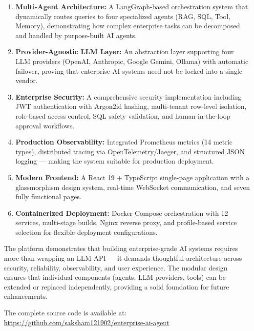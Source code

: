\documentclass[12pt, a4paper]{report}
\begin{document}
\begin{enumerate}
    \item \textbf{Multi-Agent Architecture:} A LangGraph-based orchestration system that dynamically routes queries to four specialized agents (RAG, SQL, Tool, Memory), demonstrating how complex enterprise tasks can be decomposed and handled by purpose-built AI agents.

    \item \textbf{Provider-Agnostic LLM Layer:} An abstraction layer supporting four LLM providers (OpenAI, Anthropic, Google Gemini, Ollama) with automatic failover, proving that enterprise AI systems need not be locked into a single vendor.

    \item \textbf{Enterprise Security:} A comprehensive security implementation including JWT authentication with Argon2id hashing, multi-tenant row-level isolation, role-based access control, SQL safety validation, and human-in-the-loop approval workflows.

    \item \textbf{Production Observability:} Integrated Prometheus metrics (14 metric types), distributed tracing via OpenTelemetry/Jaeger, and structured JSON logging — making the system suitable for production deployment.

    \item \textbf{Modern Frontend:} A React 19 + TypeScript single-page application with a glassmorphism design system, real-time WebSocket communication, and seven fully functional pages.

    \item \textbf{Containerized Deployment:} Docker Compose orchestration with 12 services, multi-stage builds, Nginx reverse proxy, and profile-based service selection for flexible deployment configurations.
\end{enumerate}

The platform demonstrates that building enterprise-grade AI systems requires more than wrapping an LLM API — it demands thoughtful architecture across security, reliability, observability, and user experience. The modular design ensures that individual components (agents, LLM providers, tools) can be extended or replaced independently, providing a solid foundation for future enhancements.

The complete source code is available at: \url{https://github.com/saksham121902/enterprise-ai-agent}
\end{document}
